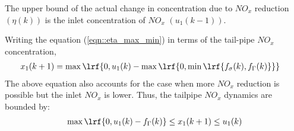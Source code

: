 The upper bound of the actual change in concentration due to $NO_x$ reduction $(\eta(k))$ is the inlet concentration of $NO_x$ $(u_1(k-1))$.

Writing the equation (\ref{eqn::eta_max_min}) in terms of the tail-pipe $NO_x$ concentration,
\begin{align}
        x_1(k+1) &= \max \lrf{0, u_1(k) - \max \lrf{ 0, \min \lrf{f_{\sigma}(k), f_{\Gamma}(k)}}}
\end{align}
The above equation also accounts for the case when more $NO_x$ reduction is possible but the inlet $NO_x$ is lower.
Thus, the tailpipe $NO_x$ dynamics are bounded by:
\begin{align}
        \max \lrf{0, u_1(k) - f_{\Gamma}(k)} \leq x_1(k+1) \leq u_1(k)
\end{align}



